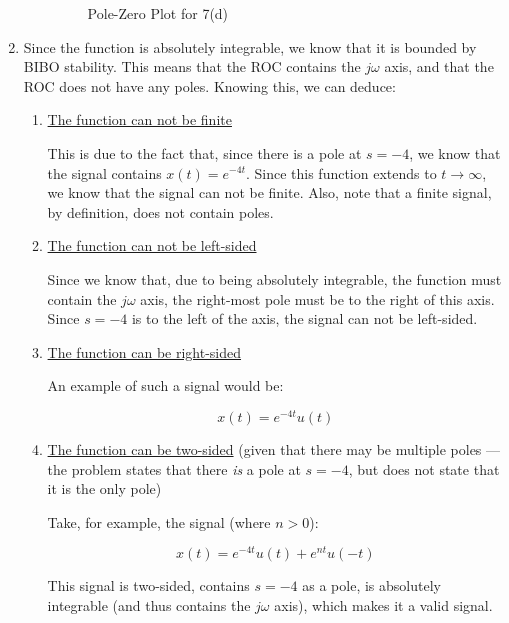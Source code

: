 \begin{enumerate}
\begin{enumerate}
        \begin{figure}[H]
          \centering
          
          \caption{Pole-Zero Plot for 7(d)}
          \label{fig:5}
        \end{figure}

    \end{enumerate}

  \item Since the function is absolutely integrable, we know that it is bounded by BIBO stability. This means that the ROC contains the $j \omega$ axis, and that the ROC does not have any poles. Knowing this, we can deduce:

    \begin{enumerate}

      \item \underline{The function can not be finite}

        This is due to the fact that, since there is a pole at $s=-4$, we know that the signal contains $x(t)=e^{-4t}$. Since this function extends to $t\to\infty$, we know that the signal can not be finite. Also, note that a finite signal, by definition, does not contain poles.

      \item \underline{The function can not be left-sided}

        Since we know that, due to being absolutely integrable, the function must contain the $j \omega$ axis, the right-most pole must be to the right of this axis. Since $s=-4$ is to the left of the axis, the signal can not be left-sided.

      \item \underline{The function can be right-sided}

        An example of such a signal would be:

        $$\boxed{x(t)=e^{-4t}u(t)}$$

      \item \underline{The function can be two-sided} (given that there may be multiple poles — the problem states that there \textit{is} a pole at $s=-4$, but does not state that it is the only pole)

        Take, for example, the signal (where $n>0$):

        $$x(t)=e^{-4t}u(t)+e^{nt}u(-t)$$

        This signal is two-sided, contains $s=-4$ as a pole, is absolutely integrable (and thus contains the $j\omega$ axis), which makes it a valid signal.


\end{enumerate}
\end{enumerate}
